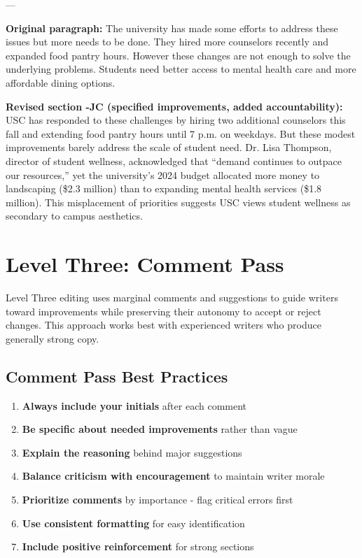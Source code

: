 \documentclass[12pt]{article}
\begin{document}
---

\begin{beforebox}
\textbf{Original paragraph:}
The university has made some efforts to address these issues but more needs to be done. They hired more counselors recently and expanded food pantry hours. However these changes are not enough to solve the underlying problems. Students need better access to mental health care and more affordable dining options.
\end{beforebox}

\begin{afterbox}
\textbf{\textcolor{atlantic}{Revised section -JC (specified improvements, added accountability):}}
USC has responded to these challenges by hiring two additional counselors this fall and extending food pantry hours until 7 p.m. on weekdays. But these modest improvements barely address the scale of student need. Dr. Lisa Thompson, director of student wellness, acknowledged that ``demand continues to outpace our resources,'' yet the university's 2024 budget allocated more money to landscaping (\$2.3 million) than to expanding mental health services (\$1.8 million). This misplacement of priorities suggests USC views student wellness as secondary to campus aesthetics.
\end{afterbox}


\newpage

\section{Level Three: Comment Pass}
\label{sec:level-three}

Level Three editing uses marginal comments and suggestions to guide writers toward improvements while preserving their autonomy to accept or reject changes. This approach works best with experienced writers who produce generally strong copy.

\subsection{Comment Pass Best Practices}

\begin{enumerate}
    \item \textbf{Always include your initials} after each comment
    \item \textbf{Be specific about needed improvements} rather than vague
    \item \textbf{Explain the reasoning} behind major suggestions
    \item \textbf{Balance criticism with encouragement} to maintain writer morale
    \item \textbf{Prioritize comments} by importance - flag critical errors first
    \item \textbf{Use consistent formatting} for easy identification
    \item \textbf{Include positive reinforcement} for strong sections
\end{enumerate}
\end{document}
